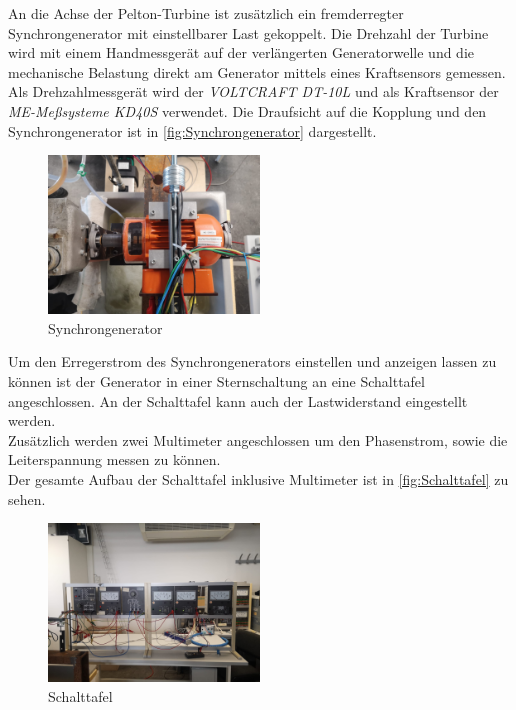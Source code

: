 An die Achse der Pelton-Turbine ist zusätzlich ein fremderregter Synchrongenerator mit einstellbarer Last gekoppelt.
Die Drehzahl der Turbine wird mit einem Handmessgerät auf der verlängerten Generatorwelle und die mechanische Belastung direkt am Generator mittels eines Kraftsensors gemessen.\\
Als Drehzahlmessgerät  wird der \textit{VOLTCRAFT DT-10L} und als Kraftsensor der \textit{ME-Meßsysteme KD40S} verwendet.
Die Draufsicht auf die Kopplung und den Synchrongenerator ist in \autoref{fig:Synchrongenerator} dargestellt.\\

\begin{figure}[H]
    \centering
    \includegraphics[width=0.5\textwidth]{Abbildungen/Generator.jpeg}
    \caption{Synchrongenerator}
    \label{fig:Synchrongenerator}
\end{figure}

Um den Erregerstrom des Synchrongenerators einstellen und anzeigen lassen zu können ist der Generator in einer Sternschaltung an eine Schalttafel angeschlossen.
An der Schalttafel kann auch der Lastwiderstand eingestellt werden.\\
Zusätzlich werden zwei Multimeter angeschlossen um den Phasenstrom, sowie die Leiterspannung messen zu können.\\
Der gesamte Aufbau der Schalttafel inklusive Multimeter ist in \autoref{fig:Schalttafel} zu sehen.

\begin{figure}[!ht]
    \centering
    \includegraphics[width=0.5\textwidth]{Abbildungen/Schalttafel.jpeg}
    \caption{Schalttafel}
    \label{fig:Schalttafel}
\end{figure}